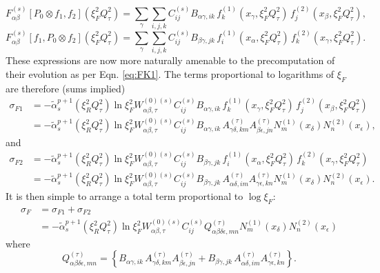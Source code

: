 \documentclass[11pt]{article}
\newcommand{\be}{\begin{equation}}
\newcommand{\ee}{\end{equation}}
\begin{document}
\be \label{eq:deconvsubprocess1} F^{(s)}_{\alpha\beta}[P_0\otimes f_1, f_2](\xi_F^2{Q^2_\tau})=\sum_\gamma \sum_{i,j,k} C^{(s)}_{ij} B_{\alpha\gamma, ik} \, 
 f_k^{(1)}(x_\gamma, \xi_F^2Q_\tau^2)\, f_j^{(2)}(x_{\beta},\xi_F^2Q^2_\tau), \ee
\be \label{eq:deconvsubprocess1} F^{(s)}_{\alpha\beta}[f_1, P_0\otimes f_2](\xi_F^2{Q^2_\tau})=\sum_\gamma \sum_{i,j,k} C^{(s)}_{ij} B_{\beta\gamma, jk} \, 
 f_i^{(1)}(x_\alpha, \xi_F^2Q_\tau^2)\, f_k^{(2)}(x_{\gamma},\xi_F^2Q^2_\tau). \ee
 These expressions are now more naturally amenable to the precomputation of their evolution as per Eqn. \ref{eq:FK1}. The terms proportional to logarithms of $\xi_F$ are therefore (sums implied)
 \begin{align}
\sigma_{F1} &=
-\tilde{\alpha}_s^{p+1}(\xi_R^2Q^2_\tau)
\ln \xi_F^2  
W_{\alpha\beta,\tau}^{(0)(s)} C^{(s)}_{ij} B_{\alpha\gamma, ik} \, 
 f_k^{(1)}(x_\gamma, \xi_F^2Q_\tau^2)\, f_j^{(2)}(x_{\beta},\xi_F^2Q^2_\tau) \nonumber \\
 &=
 -\tilde{\alpha}_s^{p+1}(\xi_R^2Q^2_\tau)
\ln \xi_F^2  
W_{\alpha\beta,\tau}^{(0)(s)} C^{(s)}_{ij} B_{\alpha\gamma, ik} \, 
A^{(\tau)}_{\gamma\delta, km} A^{(\tau)}_{\beta\epsilon, jn} N^{(1)}_{m}(x_\delta) N^{(2)}_{n}(x_\epsilon),
 \end{align}
and
\begin{align}
\sigma_{F2} &=
-\tilde{\alpha}_s^{p+1}(\xi_R^2Q^2_\tau) \ln \xi_F^2  
W_{\alpha\beta,\tau}^{(0)(s)} C^{(s)}_{ij} B_{\beta\gamma, jk} \, 
 f_i^{(1)}(x_\alpha, \xi_F^2Q_\tau^2)\, f_k^{(2)}(x_{\gamma},\xi_F^2Q^2_\tau) \nonumber \\
 &=
-\tilde{\alpha}_s^{p+1}(\xi_R^2Q^2_\tau) \ln \xi_F^2  
W_{\alpha\beta,\tau}^{(0)(s)} C^{(s)}_{ij} B_{\beta\gamma, jk} \, 
A^{(\tau)}_{\alpha\delta, im} A^{(\tau)}_{\gamma\epsilon, kn} N^{(1)}_{m}(x_\delta) N^{(2)}_{n}(x_\epsilon).
\end{align}
It is then simple to arrange a total term proportional to $\log \xi_F$:
\begin{align}
\sigma_F &= \sigma_{F1} + \sigma_{F2}\\
&= -\tilde{\alpha}_s^{p+1}(\xi_R^2Q^2_\tau) \ln \xi_F^2  W_{\alpha\beta,\tau}^{(0)(s)} C^{(s)}_{ij}  Q_{\alpha\beta\delta\epsilon, mn}^{(\tau)} N^{(1)}_{m}(x_\delta) N^{(2)}_{n}(x_\epsilon)
\end{align}
where
\be
Q_{\alpha\beta\delta\epsilon, mn}^{(\tau)} = \left\{ B_{\alpha\gamma, ik} \, 
A^{(\tau)}_{\gamma\delta, km} A^{(\tau)}_{\beta\epsilon, jn} +  B_{\beta\gamma, jk} \, 
A^{(\tau)}_{\alpha\delta, im} A^{(\tau)}_{\gamma\epsilon, kn}  \right\}.
\ee
\end{document}
